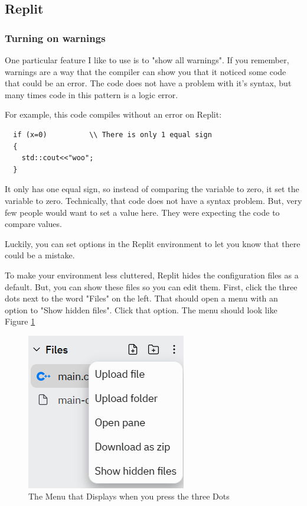 \subsection{Replit}
\subsubsection{Turning on warnings}
\label{showwarning}
One particular feature I like to use is to "show all warnings". If you remember, warnings are a way that the compiler can show you that it noticed some code that could be an error. The code does not have a problem with it's syntax, but many times code in this pattern is a logic error.

For example, this code compiles without an error on Replit:
\begin{lstlisting}
  if (x=0)          \\ There is only 1 equal sign
  {
    std::cout<<"woo";
  }
\end{lstlisting}
It only has one equal sign, so instead of comparing the variable
to zero, it set the variable to zero. Technically, that code does not have a syntax problem. But, very few people would want to set a value here. They were expecting the code to compare values.

Luckily, you can set options in the Replit environment to let you know that there could be a mistake.

To make your environment less cluttered, Replit hides the configuration files as a default. But, you can show these files so you can edit them. First, click the three dots next to the word "Files" on the left. That should open a menu with an option to "Show hidden files". Click that option. The menu should look like Figure \ref{fig:ShowHiddenMenu}

\begin{figure}[h]
    \centering
    \includegraphics{images/showhidden.PNG}
    \caption{The Menu that Displays when you press the three Dots}
    \label{fig:ShowHiddenMenu}
\end{figure}

